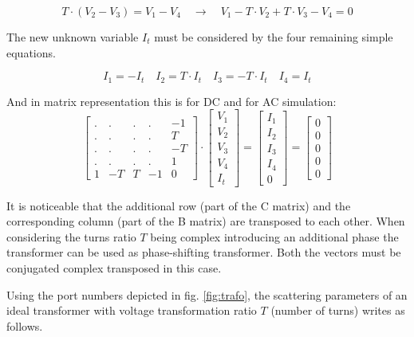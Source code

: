 \begin{equation}
T\cdot\left(V_{2} - V_{3}\right) = V_{1} -V_{4}
\quad \rightarrow \quad
V_{1} - T\cdot V_{2} + T\cdot V_{3} - V_{4} = 0
\label{eq:trafo}
\end{equation}

The new unknown variable $I_{t}$ must be considered by the four
remaining simple equations.

\begin{equation}
I_{1} = -I_{t} \quad I_{2} = T\cdot I_{t} \quad I_{3} = -T\cdot I_{t} \quad I_{4} = I_{t}
\end{equation}

And in matrix representation this is for DC and for AC simulation:
\begin{equation}
\begin{bmatrix}
.&.&.&.& -1\\
.&.&.&.& T\\
.&.&.&.& -T\\
.&.&.&.& 1\\
1 & -T & T & -1 & 0
\end{bmatrix}
\cdot
\begin{bmatrix}
V_{1}\\
V_{2}\\
V_{3}\\
V_{4}\\
I_{t}
\end{bmatrix}
=
\begin{bmatrix}
I_{1}\\
I_{2}\\
I_{3}\\
I_{4}\\
0
\end{bmatrix}
=
\begin{bmatrix}
0\\
0\\
0\\
0\\
0
\end{bmatrix}
\end{equation}

It is noticeable that the additional row (part of the C matrix) and the
corresponding column (part of the B matrix) are transposed to each
other.  When considering the turns ratio $T$ being complex introducing
an additional phase the transformer can be used as phase-shifting
transformer.  Both the vectors must be conjugated complex transposed
in this case.

\addvspace{12pt}

Using the port numbers depicted in fig. \ref{fig:trafo}, the
scattering parameters of an ideal transformer with voltage
transformation ratio $T$ (number of turns) writes as follows.

